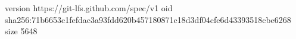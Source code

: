 version https://git-lfs.github.com/spec/v1
oid sha256:71b6653c1fefdac3a93fdd620b457180871c18d3df04cfe6d43393518cbe6268
size 5648
